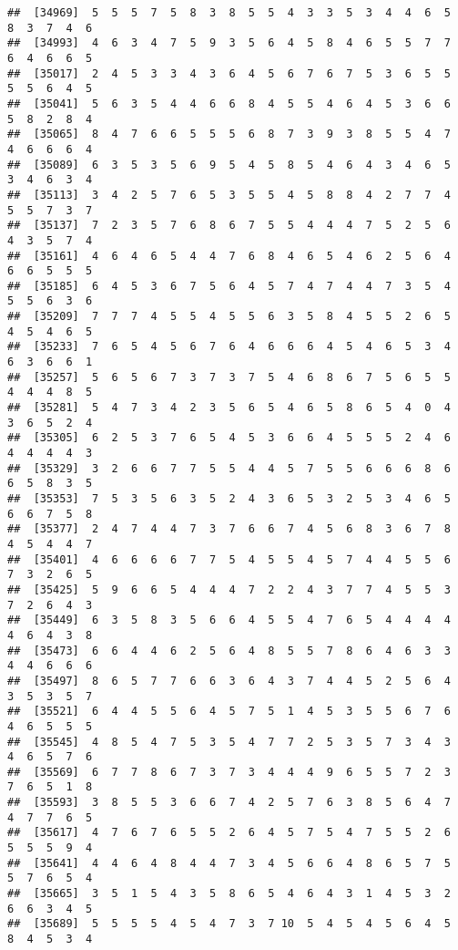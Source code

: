 \documentclass[
]{book}
\begin{document}
\begin{verbatim}
##  [34969]  5  5  5  7  5  8  3  8  5  5  4  3  3  5  3  4  4  6  5  8  3  7  4  6
##  [34993]  4  6  3  4  7  5  9  3  5  6  4  5  8  4  6  5  5  7  7  6  4  6  6  5
##  [35017]  2  4  5  3  3  4  3  6  4  5  6  7  6  7  5  3  6  5  5  5  5  6  4  5
##  [35041]  5  6  3  5  4  4  6  6  8  4  5  5  4  6  4  5  3  6  6  5  8  2  8  4
##  [35065]  8  4  7  6  6  5  5  5  6  8  7  3  9  3  8  5  5  4  7  4  6  6  6  4
##  [35089]  6  3  5  3  5  6  9  5  4  5  8  5  4  6  4  3  4  6  5  3  4  6  3  4
##  [35113]  3  4  2  5  7  6  5  3  5  5  4  5  8  8  4  2  7  7  4  5  5  7  3  7
##  [35137]  7  2  3  5  7  6  8  6  7  5  5  4  4  4  7  5  2  5  6  4  3  5  7  4
##  [35161]  4  6  4  6  5  4  4  7  6  8  4  6  5  4  6  2  5  6  4  6  6  5  5  5
##  [35185]  6  4  5  3  6  7  5  6  4  5  7  4  7  4  4  7  3  5  4  5  5  6  3  6
##  [35209]  7  7  7  4  5  5  4  5  5  6  3  5  8  4  5  5  2  6  5  4  5  4  6  5
##  [35233]  7  6  5  4  5  6  7  6  4  6  6  6  4  5  4  6  5  3  4  6  3  6  6  1
##  [35257]  5  6  5  6  7  3  7  3  7  5  4  6  8  6  7  5  6  5  5  4  4  4  8  5
##  [35281]  5  4  7  3  4  2  3  5  6  5  4  6  5  8  6  5  4  0  4  3  6  5  2  4
##  [35305]  6  2  5  3  7  6  5  4  5  3  6  6  4  5  5  5  2  4  6  4  4  4  4  3
##  [35329]  3  2  6  6  7  7  5  5  4  4  5  7  5  5  6  6  6  8  6  6  5  8  3  5
##  [35353]  7  5  3  5  6  3  5  2  4  3  6  5  3  2  5  3  4  6  5  6  6  7  5  8
##  [35377]  2  4  7  4  4  7  3  7  6  6  7  4  5  6  8  3  6  7  8  4  5  4  4  7
##  [35401]  4  6  6  6  6  7  7  5  4  5  5  4  5  7  4  4  5  5  6  7  3  2  6  5
##  [35425]  5  9  6  6  5  4  4  4  7  2  2  4  3  7  7  4  5  5  3  7  2  6  4  3
##  [35449]  6  3  5  8  3  5  6  6  4  5  5  4  7  6  5  4  4  4  4  4  6  4  3  8
##  [35473]  6  6  4  4  6  2  5  6  4  8  5  5  7  8  6  4  6  3  3  4  4  6  6  6
##  [35497]  8  6  5  7  7  6  6  3  6  4  3  7  4  4  5  2  5  6  4  3  5  3  5  7
##  [35521]  6  4  4  5  5  6  4  5  7  5  1  4  5  3  5  5  6  7  6  4  6  5  5  5
##  [35545]  4  8  5  4  7  5  3  5  4  7  7  2  5  3  5  7  3  4  3  4  6  5  7  6
##  [35569]  6  7  7  8  6  7  3  7  3  4  4  4  9  6  5  5  7  2  3  7  6  5  1  8
##  [35593]  3  8  5  5  3  6  6  7  4  2  5  7  6  3  8  5  6  4  7  4  7  7  6  5
##  [35617]  4  7  6  7  6  5  5  2  6  4  5  7  5  4  7  5  5  2  6  5  5  5  9  4
##  [35641]  4  4  6  4  8  4  4  7  3  4  5  6  6  4  8  6  5  7  5  5  7  6  5  4
##  [35665]  3  5  1  5  4  3  5  8  6  5  4  6  4  3  1  4  5  3  2  6  6  3  4  5
##  [35689]  5  5  5  5  4  5  4  7  3  7 10  5  4  5  4  5  6  4  5  8  4  5  3  4

\end{verbatim}
\end{document}

